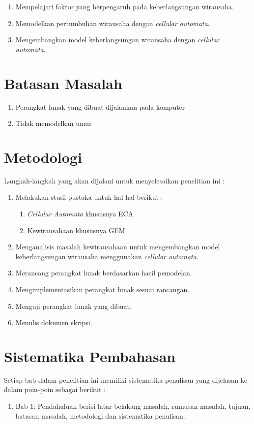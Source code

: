 \begin{enumerate}
	\item Mempelajari faktor yang berpengaruh pada keberlangsungan wirausaha.
	\item Memodelkan pertumbuhan wirausaha dengan \textit{cellular automata}.
	\item Mengembangkan model keberlangsungan wirausaha dengan \textit{cellular automata}.
\end{enumerate}

\section{Batasan Masalah}
\label{sec:batasan}
\begin{enumerate}
	\item Perangkat lunak yang dibuat dijalankan pada komputer
	\item Tidak memodelkan umur
\end{enumerate}


\section{Metodologi}
\label{sec:metlit}
Langkah-langkah yang akan dijalani untuk menyelesaikan penelitian ini :
\begin{enumerate}
	\item Melakukan studi pustaka untuk hal-hal berikut :
		\begin{enumerate}
			\item \textit{Cellular Automata} khususnya ECA
			\item Kewirausahaan khususnya GEM
		\end{enumerate}
	\item Menganalisis masalah kewirausahaan untuk mengembangkan model keberlangsungan wirausaha menggunakan \textit{cellular automata}.
	\item Merancang perangkat lunak berdasarkan hasil pemodelan.
	\item Mengimplementasikan perangkat lunak sesuai rancangan.
	\item Menguji perangkat lunak yang dibuat.
	\item Menulis dokumen skripsi.
\end{enumerate}


\section{Sistematika Pembahasan}
\label{sec:sispem}
Setiap bab dalam penelitian ini memiliki sistematika penulisan yang dijelasan ke dalam poin-poin sebagai berikut :
\begin{enumerate}
	\item Bab 1: Pendahuluan berisi latar belakang masalah, rumusan masalah, tujuan, batasan masalah, metodologi dan sistematika penulisan.
\end{enumerate}



